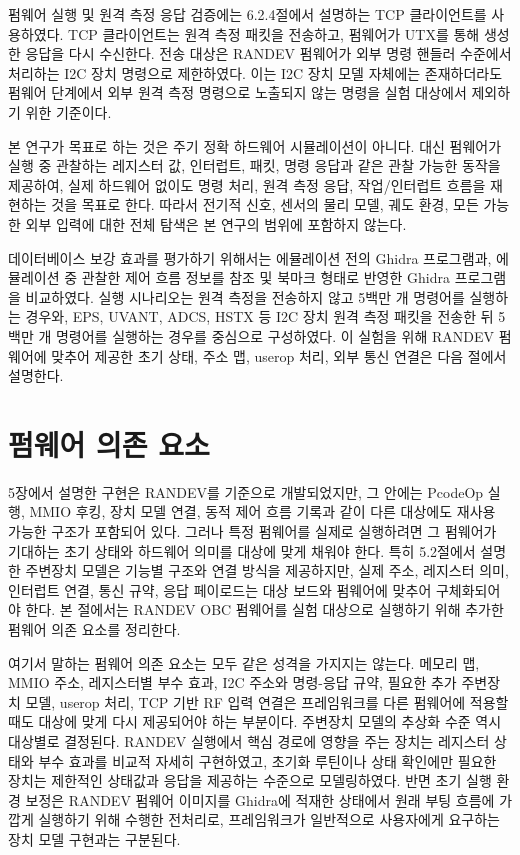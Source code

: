 \documentclass[master,korean,final]{kaist-ucs}
\begin{document}
펌웨어 실행 및 원격 측정 응답 검증에는 6.2.4절에서 설명하는 TCP 클라이언트를 사용하였다. TCP 클라이언트는 원격 측정 패킷을 전송하고, 펌웨어가 UTX를 통해 생성한 응답을 다시 수신한다. 전송 대상은 RANDEV 펌웨어가 외부 명령 핸들러 수준에서 처리하는 I2C 장치 명령으로 제한하였다. 이는 I2C 장치 모델 자체에는 존재하더라도 펌웨어 단계에서 외부 원격 측정 명령으로 노출되지 않는 명령을 실험 대상에서 제외하기 위한 기준이다.

본 연구가 목표로 하는 것은 주기 정확 하드웨어 시뮬레이션이 아니다. 대신 펌웨어가 실행 중 관찰하는 레지스터 값, 인터럽트, 패킷, 명령 응답과 같은 관찰 가능한 동작을 제공하여, 실제 하드웨어 없이도 명령 처리, 원격 측정 응답, 작업/인터럽트 흐름을 재현하는 것을 목표로 한다. 따라서 전기적 신호, 센서의 물리 모델, 궤도 환경, 모든 가능한 외부 입력에 대한 전체 탐색은 본 연구의 범위에 포함하지 않는다.

데이터베이스 보강 효과를 평가하기 위해서는 에뮬레이션 전의 Ghidra 프로그램과, 에뮬레이션 중 관찰한 제어 흐름 정보를 참조 및 북마크 형태로 반영한 Ghidra 프로그램을 비교하였다. 실행 시나리오는 원격 측정을 전송하지 않고 5백만 개 명령어를 실행하는 경우와, EPS, UVANT, ADCS, HSTX 등 I2C 장치 원격 측정 패킷을 전송한 뒤 5백만 개 명령어를 실행하는 경우를 중심으로 구성하였다. 이 실험을 위해 RANDEV 펌웨어에 맞추어 제공한 초기 상태, 주소 맵, userop 처리, 외부 통신 연결은 다음 절에서 설명한다.

\section{펌웨어 의존 요소}

5장에서 설명한 구현은 RANDEV를 기준으로 개발되었지만, 그 안에는 PcodeOp 실행, MMIO 후킹, 장치 모델 연결, 동적 제어 흐름 기록과 같이 다른 대상에도 재사용 가능한 구조가 포함되어 있다. 그러나 특정 펌웨어를 실제로 실행하려면 그 펌웨어가 기대하는 초기 상태와 하드웨어 의미를 대상에 맞게 채워야 한다. 특히 5.2절에서 설명한 주변장치 모델은 기능별 구조와 연결 방식을 제공하지만, 실제 주소, 레지스터 의미, 인터럽트 연결, 통신 규약, 응답 페이로드는 대상 보드와 펌웨어에 맞추어 구체화되어야 한다. 본 절에서는 RANDEV OBC 펌웨어를 실험 대상으로 실행하기 위해 추가한 펌웨어 의존 요소를 정리한다.

여기서 말하는 펌웨어 의존 요소는 모두 같은 성격을 가지지는 않는다. 메모리 맵, MMIO 주소, 레지스터별 부수 효과, I2C 주소와 명령-응답 규약, 필요한 추가 주변장치 모델, userop 처리, TCP 기반 RF 입력 연결은 프레임워크를 다른 펌웨어에 적용할 때도 대상에 맞게 다시 제공되어야 하는 부분이다. 주변장치 모델의 추상화 수준 역시 대상별로 결정된다. RANDEV 실행에서 핵심 경로에 영향을 주는 장치는 레지스터 상태와 부수 효과를 비교적 자세히 구현하였고, 초기화 루틴이나 상태 확인에만 필요한 장치는 제한적인 상태값과 응답을 제공하는 수준으로 모델링하였다. 반면 초기 실행 환경 보정은 RANDEV 펌웨어 이미지를 Ghidra에 적재한 상태에서 원래 부팅 흐름에 가깝게 실행하기 위해 수행한 전처리로, 프레임워크가 일반적으로 사용자에게 요구하는 장치 모델 구현과는 구분된다.
\end{document}
